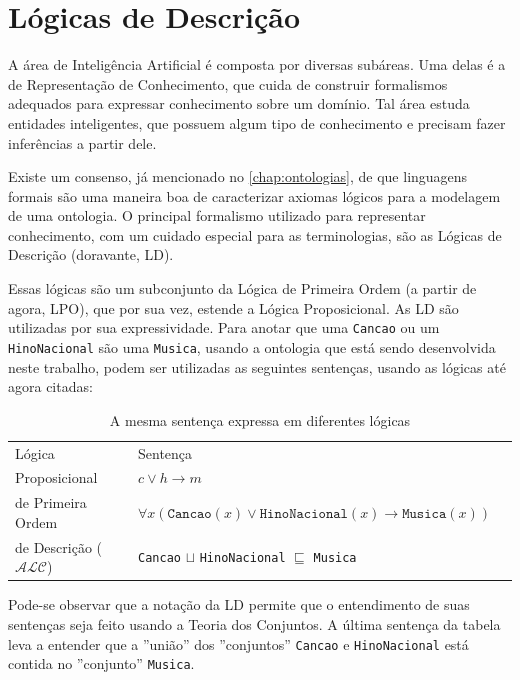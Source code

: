 \chapter{Lógicas de Descrição}
\label{chap:logicas}

\lettrine{A}{} área de Inteligência Artificial é composta por diversas subáreas. Uma delas é a de Representação de Conhecimento, que cuida de construir formalismos adequados para expressar conhecimento sobre um domínio. Tal área estuda entidades inteligentes, que possuem algum tipo de conhecimento e precisam fazer inferências a partir dele.

Existe um consenso, já mencionado no \autoref{chap:ontologias}, de que linguagens formais são uma maneira boa de caracterizar axiomas lógicos para a modelagem de uma ontologia. O principal formalismo utilizado para representar conhecimento, com um cuidado especial para as terminologias, são as Lógicas de Descrição (doravante, LD).

Essas lógicas são um subconjunto da Lógica de Primeira Ordem (a partir de agora, LPO), que por sua vez, estende a Lógica Proposicional. As LD são utilizadas por sua expressividade. Para anotar que uma \texttt{Cancao} ou um \texttt{HinoNacional} são uma \texttt{Musica}, usando a ontologia que está sendo desenvolvida neste trabalho, podem ser utilizadas as seguintes sentenças, usando as lógicas até agora citadas:

\begin{table}[H]
	\centering
	\begin{tabular}{|l|l|l}
		\cline{1-2}
		Lógica                           & Sentença                                                                             & \\ \cline{1-2}
		Proposicional                    & $c \lor h \to m$                                                                     & \\ \cline{1-2}
		de Primeira Ordem                & $\forall x(\texttt{Cancao}(x) \lor \texttt{HinoNacional}(x) \to \texttt{Musica}(x))$ & \\ \cline{1-2}
		de Descrição ($ \mathcal{ALC} $) & \texttt{Cancao} $\sqcup$ \texttt{HinoNacional} $\sqsubseteq$ \texttt{Musica}         & \\ \cline{1-2}
	\end{tabular}
\caption{A mesma sentença expressa em diferentes lógicas}
\end{table}

Pode-se observar que a notação da LD permite que o entendimento de suas sentenças seja feito usando a Teoria dos Conjuntos. A última sentença da tabela leva a entender que a ''união'' dos ''conjuntos'' \texttt{Cancao} e \texttt{HinoNacional} está contida no ''conjunto'' \texttt{Musica}.

